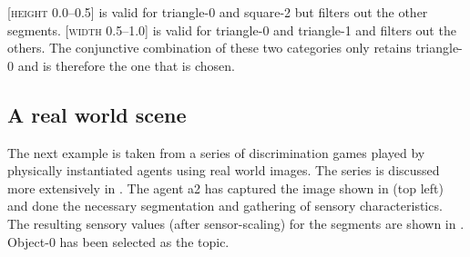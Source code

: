 [\textsc{height} 0.0–0.5] is valid for triangle-0 and square-2 but
filters out the other segments. 
[\textsc{width} 0.5–1.0] is valid for triangle-0 and triangle-1 and 
filters out the others.  
The conjunctive combination of these two categories only 
retains triangle-0 and is therefore the one that is chosen. 

\subsection{A real world scene}

The next example is taken from a series of discrimination 
games played by physically instantiated agents using 
real world images. The series is discussed more extensively 
in . The agent {\bfshape a2} has 
captured the image shown in 
(top left) and done the necessary segmentation and 
gathering of sensory characteristics. The resulting sensory
values (after sensor-scaling) for the segments are shown
in . Object-0 has been selected as the topic. 

